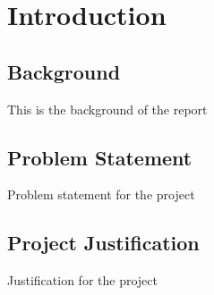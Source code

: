 \chapter{Introduction}
\section{Background}
This is the background of the report
\section{Problem Statement}
Problem statement for the project
\section{Project Justification}
Justification for the project